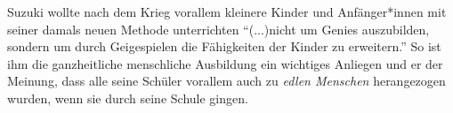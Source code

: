 Suzuki wollte nach dem Krieg vorallem kleinere Kinder und Anfänger*innen mit seiner
damals neuen Methode unterrichten \enquote{(...)nicht um Genies auszubilden, sondern um
durch Geigespielen die Fähigkeiten der Kinder zu erweitern.}
\autocite[43]{suzuki:erziehung_ist_liebe} So
ist ihm die ganzheitliche menschliche Ausbildung ein wichtiges Anliegen
und er der Meinung, dass alle seine Schüler vorallem auch zu \emph{edlen Menschen}
herangezogen wurden, wenn sie durch seine Schule gingen. 










